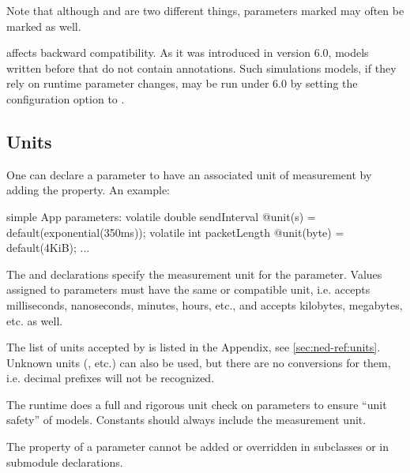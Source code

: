 \begin{hint}
    Note that although  and  are two different
    things, parameters marked  may often be marked
     as well.
\end{hint}

\begin{note}
     affects backward compatibility. As it was introduced in
    {\opp} version 6.0, models written before that do not contain 
    annotations. Such simulations models, if they rely on runtime parameter changes,
    may be run under {\opp} 6.0 by setting the 
    configuration option to .
\end{note}


\subsection{Units}
\label{sec:ned-lang:units}

One can declare a parameter to have an associated unit of measurement
by adding the  property. An example:

\begin{ned}
simple App
{
    parameters:
        volatile double sendInterval @unit(s) = default(exponential(350ms));
        volatile int packetLength @unit(byte) = default(4KiB);
    ...
}
\end{ned}

The  and  declarations specify the measurement unit
for the parameter. Values assigned to parameters must have the same or
compatible unit, i.e.  accepts milliseconds, nanoseconds,
minutes, hours, etc., and  accepts kilobytes, megabytes,
etc. as well.

\begin{note}
    The list of units accepted by {\opp} is listed in the Appendix, see
    \ref{sec:ned-ref:units}. Unknown units (, etc.)
    can also be used, but there are no conversions for them,
    i.e. decimal prefixes will not be recognized.
\end{note}

The {\opp} runtime does a full and rigorous unit check on
parameters to ensure ``unit safety'' of models. Constants should
always include the measurement unit.

The  property of a parameter cannot be added or overridden
in subclasses or in submodule declarations.


